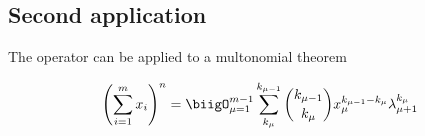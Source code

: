 \subsection{Second application}

The operator can be applied to a multonomial theorem

\begin{align}
      \left( \sum_{i=1}^m x_i \right)^n = \biigO_{\mu 
      =1}^{m-1}\sum_{k_\mu}^{k_{\mu-1}} \binom{k_{\mu-
      1}}{k_\mu}x_\mu^{k_{\mu-1}-k_\mu}\lambda^{k_\mu}_{\mu+1}
\end{align}

